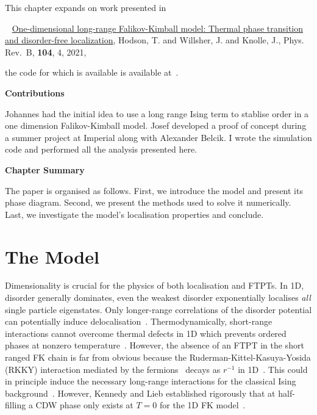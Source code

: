 This chapter expands on work presented in

~\autocite{hodsonOnedimensionalLongrangeFalikovKimball2021} \href{https://link.aps.org/doi/10.1103/PhysRevB.104.045116}{One-dimensional long-range Falikov-Kimball model: Thermal phase transition and disorder-free localization}, Hodson, T. and Willsher, J. and Knolle, J., Phys. Rev.~B, \textbf{104}, 4, 2021,

the code for which is available is available at~\autocite{hodsonMCMCFKModel2021}.

\textbf{Contributions}

Johannes had the initial idea to use a long range Ising term to stablise order in a one dimension Falikov-Kimball model. Josef developed a proof of concept during a summer project at Imperial along with Alexander Belcik. I wrote the simulation code and performed all the analysis presented here.

\textbf{Chapter Summary}

The paper is organised as follows. First, we introduce the model and present its phase diagram. Second, we present the methods used to solve it numerically. Last, we investigate the model's localisation properties and conclude.

\hypertarget{fk-model}{%
\section{The Model}\label{fk-model}}

Dimensionality is crucial for the physics of both localisation and FTPTs. In 1D, disorder generally dominates, even the weakest disorder exponentially localises \emph{all} single particle eigenstates. Only longer-range correlations of the disorder potential can potentially induce delocalisation~\autocite{aubryAnalyticityBreakingAnderson1980,dassarmaLocalizationMobilityEdges1990,dunlapAbsenceLocalizationRandomdimer1990}. Thermodynamically, short-range interactions cannot overcome thermal defects in 1D which prevents ordered phases at nonzero temperature~\autocite{andersonAbsenceDiffusionCertain1958,goldshteinPurePointSpectrum1977,abrahamsScalingTheoryLocalization1979,kramerLocalizationTheoryExperiment1993}. However, the absence of an FTPT in the short ranged FK chain is far from obvious because the Ruderman-Kittel-Kasuya-Yosida (RKKY) interaction mediated by the fermions~\autocite{kasuyaTheoryMetallicFerro1956,rudermanIndirectExchangeCoupling1954,vanvleckNoteInteractionsSpins1962,yosidaMagneticPropertiesCuMn1957} decays as \(r^{-1}\) in 1D~\autocite{rusinCalculationRKKYRange2017}. This could in principle induce the necessary long-range interactions for the classical Ising background~\autocite{thoulessLongRangeOrderOneDimensional1969,peierlsIsingModelFerromagnetism1936}. However, Kennedy and Lieb established rigorously that at half-filling a CDW phase only exists at \(T = 0\) for the 1D FK model~\autocite{kennedyItinerantElectronModel1986}.

